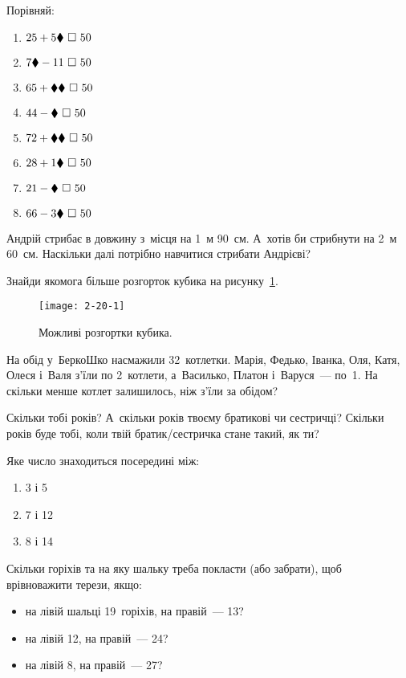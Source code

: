 Порівняй:
\begin{multicols}{2}
  \begin{enumerate}
    \item $25 + 5\hiddendigit \ \square \ 50$
    \item $7\hiddendigit - 11 \ \square \ 50$
    \item $65 + \hiddendigit\hiddendigit \ \square \ 50$
    \item $44 - \hiddendigit \ \square \ 50$
    \item $72 + \hiddendigit\hiddendigit \ \square \ 50$
    \item $28 + 1\hiddendigit \ \square \ 50$
    \item $21 - \hiddendigit \ \square \ 50$
    \item $66 - 3\hiddendigit \ \square \ 50$
  \end{enumerate}
\end{multicols}


\problem
Андрій стрибає в довжину з~місця на 1~м 90~см.
А~хотів би стрибнути на 2~м 60~см.
Наскільки далі потрібно навчитися стрибати Андрієві?


\problem
Знайди якомога більше розгорток кубика на рисунку~\ref{fig:cubes}.

\begin{figure}[ht]
  \centering
  \texttt{[image: 2-20-1]}
  \caption{Можливі розгортки кубика.}
  \label{fig:cubes}
\end{figure}


\problem
На обід у~БеркоШко насмажили 32~котлетки.
Марія, Федько, Іванка, Оля, Катя, Олеся і~Валя з’їли по 2~котлети,
а~Василько, Платон і~Варуся~--- по~1.
На скільки менше котлет залишилось, ніж з’їли за обідом?


\problem
Скільки тобі років?
А~скільки років твоєму братикові чи сестричці?
Скільки років буде тобі, коли твій братик/сестричка стане такий, як ти?


\problem
Яке число знаходиться посередині між:
\begin{multicols}{3}
  \begin{enumerate}
    \item 3 і 5
    \item 7 і 12
    \item 8 і 14
  \end{enumerate}
\end{multicols}


\problem
Скільки горіхів та на яку шальку треба покласти (або забрати),
щоб врівноважити терези, якщо:
\begin{itemize}
  \item на лівій шальці 19~горіхів, на правій~--- 13?
  \item на лівій 12, на правій~--- 24?
  \item на лівій 8, на правій~--- 27?
\end{itemize}


